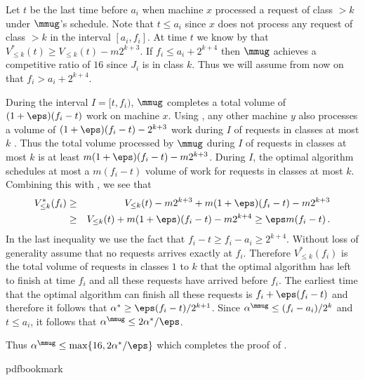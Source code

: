 Let $t$ be the last time before $a_i$ when machine $x$ processed a request
of class $> k$ under $\mmug$'s schedule. Note that $t \leq a_i$ since $x$ does not process any
request of class $> k$ in the interval $[a_i,f_i]$. At time $t$ we
know by  that $V^*_{\leq k} (t) \geq
V_{\leq k} (t) - m2^{k+3}$. If $f_i \le a_i + 2^{k+4}$ then $\mmug$
achieves a competitive ratio of $16$ since $J_i$ is in class
$k$. Thus we will assume from now on that $f_i > a_i + 2^{k+4}$.

During the interval $I = [t, f_i)$, $\mmug$ completes a total volume of
$(1 + \eps)(f_i - t)$ work on machine $x$. Using , any
other machine $y$ also processes a volume of $(1+\eps)(f_i-t) -
2^{k+3}$ work during $I$ of requests in classes at most $k$ . Thus the total volume processed by $\mmug$ during $I$ of requests in classes at most $ k$ is at least $m(1+\eps)(f_i-t) -
m2^{k+3}$.  During $I$, the optimal algorithm schedules at most a
$m(f_i-t)$ volume of work for requests in classes at most $k$.  Combining this with
, we see that
\begin{eqnarray*}
V^*_{\le k}(f_i) & \ge & V_{\le k}(t) - m2^{k+3} + m(1+\eps)(f_i-t)  - m2^{k+3} \\
  & \ge & V_{\le k}(t) + m(1+\eps)(f_i-t) - m2^{k+4} \ge   \eps m (f_i - t)\,.
\end{eqnarray*}
In the last inequality we use the fact that $f_i-t \ge f_i -
a_i \ge 2^{k+4}$. Without loss of generality assume that no
requests arrives exactly at $f_i$. Therefore $V^*_{\le k}(f_i)$ is the
total volume of requests in classes $1$ to $k$ that the optimal
algorithm has left to finish at time $f_i$ and all these requests have
arrived before $f_i$. The earliest time that the optimal algorithm can
finish all these requests is $f_i + \eps (f_i-t)$ and therefore it
follows that $\alpha^* \ge \eps (f_i - t)/2^{k+1}$. Since $\alpha^\mmug \le (f_i-a_i)/2^k$ and $t \leq a_i$, it follows that $\alpha^\mmug \le 2 \alpha^*/\eps$.

Thus $\alpha^\mmug \le \max\{16, 2\alpha^*/\eps\}$ which completes the proof
of .

%
%
%
%
%
\providecommand{\bibhead}[1]{}
%
\expandafter\ifx\csname pdfbookmark\endcsname\relax%
  \providecommand{\tocrefpdfbookmark}{}
\else\providecommand{\tocrefpdfbookmark}{%
   \hypertarget{tocreferences}{}%
   \pdfbookmark[1]{References}{tocreferences}}%
\fi

